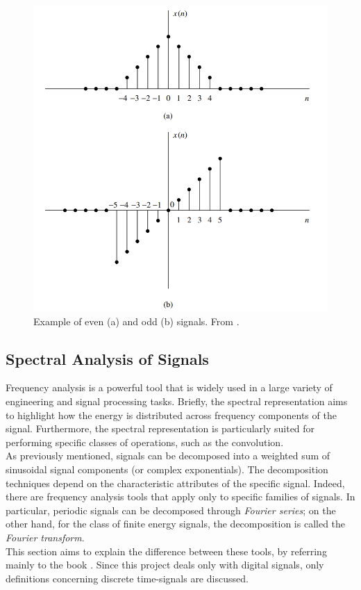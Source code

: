 \begin{itemize}
	\begin{figure}[H]
		\begin{center}
			\includegraphics[scale=0.8]{img/evenodd.png}
			\captionsetup{margin=2cm}
			\caption{Example of even (a) and odd (b) signals. From \cite{proakis2006dimitris}.} 
			\label{fig:evenodd}
		\end{center}
	\end{figure}
\end{itemize}

\subsection{Spectral Analysis of Signals} \label{fourier}
Frequency analysis is a powerful tool that is widely used in a large variety of engineering and signal processing tasks. Briefly, the spectral representation aims to highlight how the energy is distributed across frequency components of the signal. Furthermore, the spectral representation is particularly suited for performing specific classes of operations, such as the convolution. \\
As previously mentioned, signals can be decomposed into a weighted sum of sinusoidal signal components (or complex exponentials). The decomposition techniques depend on the characteristic attributes of the specific signal. Indeed, there are frequency analysis tools that apply only to specific families of signals. In particular, periodic signals can be decomposed through \textit{Fourier series}; on the other hand, for the class of finite energy signals, the decomposition is called the \textit{Fourier transform}. \\
This section aims to explain the difference between these tools, by referring mainly to the book \cite{proakis2006dimitris}. Since this project deals only with digital signals, only definitions concerning discrete time-signals are discussed.
